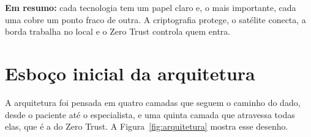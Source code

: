 \documentclass[12pt,a4paper]{article}
\newcommand{\resumo}[1]{\begin{emresumo}\textbf{\color{azul}Em resumo:} #1\end{emresumo}}
\begin{document}
\resumo{cada tecnologia tem um papel claro e, o mais importante, cada uma cobre um ponto fraco de outra. A criptografia protege, o satélite conecta, a borda trabalha no local e o Zero Trust controla quem entra.}

\section{Esboço inicial da arquitetura}

A arquitetura foi pensada em quatro camadas que seguem o caminho do dado, desde o paciente até o especialista, e uma quinta camada que atravessa todas elas, que é a do Zero Trust. A Figura~\ref{fig:arquitetura} mostra esse desenho.
\end{document}
